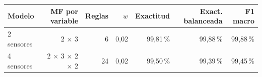 \begin{tabular}{lrrrrrr}
\toprule
Modelo & MF por variable & Reglas & $w$ & Exactitud & Exact. balanceada & F1 macro \\
\midrule
2 sensores & 2 $\times$ 3 & 6 & 0,02 & 99,81\,\% & 99,88\,\% & 99,88\,\% \\
4 sensores & 2 $\times$ 3 $\times$ 2 $\times$ 2 & 24 & 0,02 & 99,50\,\% & 99,39\,\% & 99,45\,\% \\
\bottomrule
\end{tabular}
